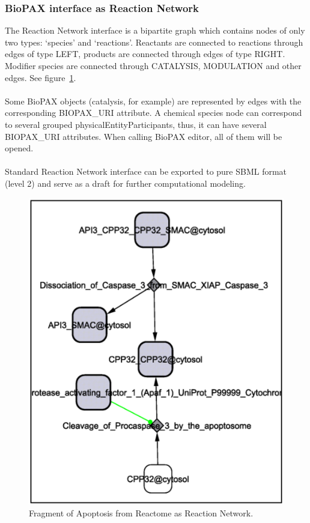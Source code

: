 \subsubsection{BioPAX interface as Reaction Network}
The Reaction Network interface is a bipartite graph which contains nodes of only two types: ‘species’ and ‘reactions’. Reactants are connected to reactions through edges of type LEFT, products are connected through edges of type RIGHT. Modifier species are connected through CATALYSIS, MODULATION and other edges. See figure~\ref{BioPAX_reaction_network}.\\\\
Some BioPAX objects (catalysis, for example) are represented by edges with the corresponding BIOPAX\_URI attribute.
A chemical species node can correspond to several grouped physicalEntityParticipants, thus, it can have several BIOPAX\_URI attributes. When calling BioPAX editor, all of them will be opened.\\\\
Standard Reaction Network interface can be exported to pure SBML format (level 2) and serve as a draft for further computational modeling.
\begin{figure}
\centering
\includegraphics[width=10 cm]{graphics/BioPAX_reaction_network}
\caption{Fragment of Apoptosis from Reactome as Reaction Network.}
\label{BioPAX_reaction_network}
\end{figure}
